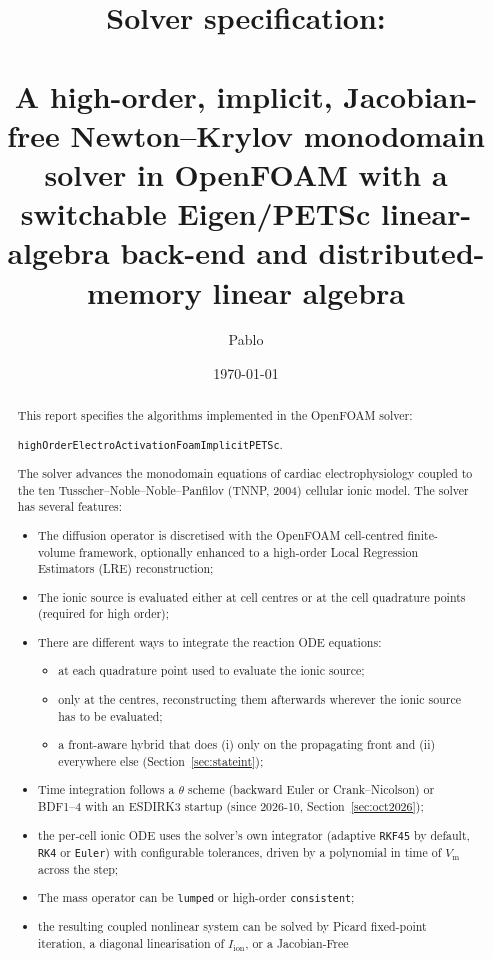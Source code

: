 \documentclass[11pt,a4paper]{article}
\title{Solver specification:\\
       \texorpdfstring{\code{highOrderElectroActivationFoamImplicitPETScDistributed}}{highOrderElectroActivationFoamImplicitPETScDistributed}\\
       \large A high-order, implicit, Jacobian-free Newton--Krylov monodomain
       solver in OpenFOAM with a switchable Eigen/PETSc linear-algebra
       back-end and distributed-memory linear algebra}
\author{Pablo}
\date{\today}
\newcommand{\code}[1]{\texttt{\small #1}}
\newcommand{\Vm}{V_{\text{m}}}
\newcommand{\Iion}{I_{\mathrm{ion}}}
\begin{document}
\maketitle

\begin{abstract}
This report specifies the algorithms implemented in the OpenFOAM solver:

\begin{center}
\code{highOrderElectroActivationFoamImplicitPETSc}.
\end{center}

The solver advances the monodomain equations
of cardiac electrophysiology coupled to the
ten Tusscher--Noble--Noble--Panfilov (TNNP, 2004) cellular ionic model. The solver
has several features:
\begin{itemize}
\item The diffusion operator is
discretised with the OpenFOAM cell-centred finite-volume framework,
optionally enhanced to a high-order Local
Regression Estimators (LRE) reconstruction;
\item The ionic source is evaluated either at cell
centres or at the cell quadrature points (required for high order);
\item There are different ways to integrate the reaction ODE equations:
\begin{itemize}
\item[(i)] at each quadrature point used to evaluate the ionic source;
\item[(ii)] only at the centres, reconstructing them afterwards wherever the ionic source has to be evaluated;
\item[(iii)] a front-aware hybrid that does (i) only on the propagating front and (ii) everywhere else (Section~\ref{sec:stateint});
\end{itemize}
\item Time integration follows a $\theta$ scheme (backward Euler or
Crank--Nicolson) or BDF1--4 with an ESDIRK3 startup (since 2026-10,
Section~\ref{sec:oct2026});
\item the per-cell ionic
ODE uses the solver's own integrator (adaptive \code{RKF45} by default,
\code{RK4} or \code{Euler}) with configurable tolerances, driven by a
polynomial in time of $\Vm$ across the step;
\item The mass operator can be \code{lumped} or high-order \code{consistent};
\item the resulting coupled nonlinear system can be solved by Picard fixed-point
iteration, a diagonal linearisation of $\Iion$, or a Jacobian-Free

\end{itemize}
\end{abstract}
\end{document}
